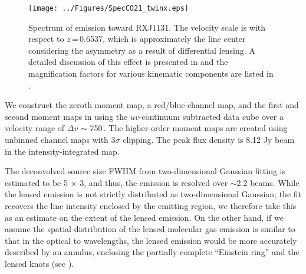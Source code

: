\documentclass[]{emulateapj}
\begin{document}
\begin{figure}[!htbp]
\centering
\texttt{[image: ../Figures/SpecCO21\_twinx.eps]}
\caption{ Spectrum of \bco emission toward RXJ1131. The velocity scale
is with respect to $z$\,=\,0.6537, which is approximately the line center
considering the asymmetry as a result of differential lensing.
A detailed discussion of this effect is presented in
 and the magnification factors for various kinematic
components are listed in .
 \label{fig:CO21spec}}
\end{figure}

We construct the zeroth moment map, a red/blue channel map, and
the first and second moment maps in 
using the $uv$-continuum subtracted data cube over a velocity range of
$\Delta v$ $\sim$ 750\,\kms.
The higher-order moment maps are created using
unbinned channel maps with 3$\sigma$ clipping.
The peak flux density is 8.12 Jy\,\kms\,beam\pmOne
in the intensity-integrated map.

The deconvolved source size FWHM from two-dimensional Gaussian fitting
is estimated to be 5 $\times$ 3,
and thus, the emission is resolved over $\sim$2.2 beams.
While the lensed emission is not strictly distributed as two-dimensional
Gaussian;
the fit recovers the line intensity enclosed by the emitting
region, we therefore take this as an estimate on the extent of the lensed
emission. On the other hand, if we assume the spatial distribution of
the lensed molecular gas emission is similar to that in the optical to \nir
wavelengths, the lensed emission would be more accurately described by an
annulus, enclosing the partially complete ``Einstein ring'' and
the lensed knots (see ).
\end{document}
